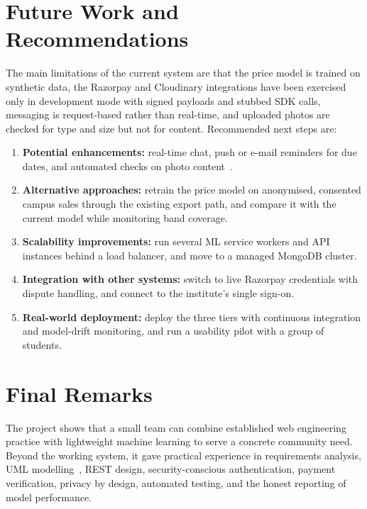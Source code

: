 \documentclass[12pt,letterpaper,twoside,openany]{report}
\begin{document}
\section{Future Work and Recommendations}
The main limitations of the current system are that the price model is trained on synthetic data, the
Razorpay and Cloudinary integrations have been exercised only in development mode with signed payloads and
stubbed SDK calls, messaging is request-based rather than real-time, and uploaded photos are checked for type
and size but not for content. Recommended next steps are:
\begin{enumerate}
  \item \textbf{Potential enhancements:} real-time chat, push or e-mail reminders for due dates, and
        automated checks on photo content~\cite{sommerville}.
  \item \textbf{Alternative approaches:} retrain the price model on anonymised, consented campus sales
        through the existing export path, and compare it with the current model while monitoring band
        coverage.
  \item \textbf{Scalability improvements:} run several ML service workers and API instances behind a load
        balancer, and move to a managed MongoDB cluster.
  \item \textbf{Integration with other systems:} switch to live Razorpay credentials with dispute handling,
        and connect to the institute's single sign-on.
  \item \textbf{Real-world deployment:} deploy the three tiers with continuous integration and model-drift
        monitoring, and run a usability pilot with a group of students.
\end{enumerate}

\section{Final Remarks}
The project shows that a small team can combine established web engineering practice with lightweight
machine learning to serve a concrete community need. Beyond the working system, it gave practical
experience in requirements analysis, UML modelling~\cite{uml}, REST design, security-conscious
authentication, payment verification, privacy by design, automated testing, and the honest reporting of
model performance.
\end{document}
